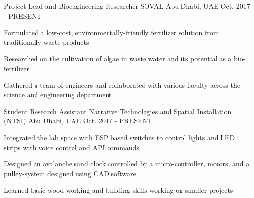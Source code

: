 

\begin{cventries}

  \cventry
    {Project Lead and Bioengineering Researcher} %
    {SOVAL} %
    {Abu Dhabi, UAE} %
    {Oct. 2017 - PRESENT} %
    {
      \begin{cvitems} %
        \item {Formulated a low-cost, environmentally-friendly fertilizer solution from traditionally waste products}
        \item {Researched on the cultivation of algae in waste water and its potential as a bio-fertilizer}
        \item {Gathered a team of engineers and collaborated with various faculty across the science and engineering department}
      \end{cvitems}
    }

  \cventry
    {Student Research Assistant} %
    {Narrative Technologies and Spatial Installation (NTSI)} %
    {Abu Dhabi, UAE} %
    {Oct. 2017 - PRESENT} %
    {
      \begin{cvitems} %
        \item {Integrated the lab space with ESP based switches to control lights and LED strips with voice control and API commands}
        \item {Designed an avalanche sand clock controlled by a micro-controller, motors, and a pulley-system designed using CAD software}
        \item {Learned basic wood-working and building skills working on smaller projects}
      \end{cvitems}
    }


\end{cventries}
